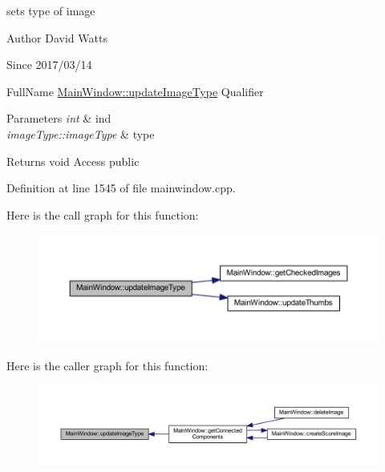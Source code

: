 sets type of image

\begin{DoxyAuthor}{Author}
David Watts 
\end{DoxyAuthor}
\begin{DoxySince}{Since}
2017/03/14
\end{DoxySince}
Full\+Name \hyperlink{class_main_window_a171b0591a4f66b4b16a33d4af5c35465}{Main\+Window\+::update\+Image\+Type} Qualifier 
\begin{DoxyParams}{Parameters}
{\em int} & ind \\
\hline
{\em image\+Type\+::image\+Type} & type \\
\hline
\end{DoxyParams}
\begin{DoxyReturn}{Returns}
void Access public 
\end{DoxyReturn}


Definition at line 1545 of file mainwindow.\+cpp.

Here is the call graph for this function\+:
\nopagebreak
\begin{figure}[H]
\begin{center}
\leavevmode
\includegraphics[width=350pt]{class_main_window_a171b0591a4f66b4b16a33d4af5c35465_cgraph}
\end{center}
\end{figure}
Here is the caller graph for this function\+:
\nopagebreak
\begin{figure}[H]
\begin{center}
\leavevmode
\includegraphics[width=350pt]{class_main_window_a171b0591a4f66b4b16a33d4af5c35465_icgraph}
\end{center}
\end{figure}
\mbox{\label{class_main_window_a89dfa31ef44692bb1d7307f0c35838c0}} 
